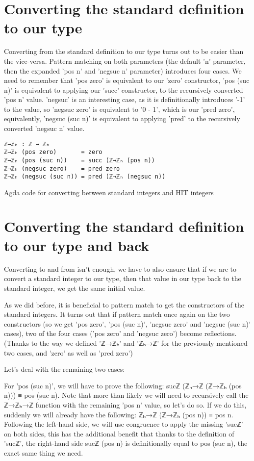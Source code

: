 \section{Converting the standard definition to our type}
Converting from the standard definition to our type turns out to be easier than the vice-versa. Pattern matching on both parameters (the default 'n' parameter, then the expanded 'pos n' and 'negsuc n' parameter) introduces four cases. We need to remember that 'pos zero' is equivalent to our 'zero' constructor, 'pos (suc n)' is equivalent to applying our 'succ' constructor, to the recursively converted 'pos n' value. 'negsuc' is an interesting case, as it is definitionally introduces '-1' to the value, so 'negsuc zero' is equivalent to '0 - 1', which is our 'pred zero', equivalently, 'negsuc (suc n)' is equivalent to applying 'pred' to the recursively converted 'negsuc n' value.
\begin{listing}[H]
\begin{verbatim}
ℤ→ℤₕ : ℤ → ℤₕ
ℤ→ℤₕ (pos zero)       = zero
ℤ→ℤₕ (pos (suc n))    = succ (ℤ→ℤₕ (pos n))
ℤ→ℤₕ (negsuc zero)    = pred zero
ℤ→ℤₕ (negsuc (suc n)) = pred (ℤ→ℤₕ (negsuc n))
\end{verbatim}
\caption{Agda code for converting between standard integers and HIT integers}
\end{listing}

\section{Converting the standard definition to our type and back}
Converting to and from isn't enough, we have to also ensure that if we are to convert a standard integer to our type, then that value in our type back to the standard integer, we get the same initial value.

As we did before, it is beneficial to pattern match to get the constructors of the standard integers. It turns out that if pattern match once again on the two constructors (so we get 'pos zero', 'pos (suc n)', 'negsuc zero' and 'negsuc (suc n)' cases), two of the four cases ('pos zero' and 'negsuc zero') become reflections. (Thanks to the way we defined 'ℤ→ℤₕ' and 'ℤₕ→ℤ' for the previously mentioned two cases, and 'zero' as well as 'pred zero')

Let's deal with the remaining two cases:

For 'pos (suc n)', we will have to prove the following: sucℤ (ℤₕ→ℤ (ℤ→ℤₕ (pos n))) ≡ pos (suc n). Note that more than likely we will need to recursively call the ℤ→ℤₕ→ℤ function with the remaining 'pos n' value, so let's do so. If we do this, suddenly we will already have the following: ℤₕ→ℤ (ℤ→ℤₕ (pos n)) ≡ pos n. Following the left-hand side, we will use congruence to apply the missing 'sucℤ' on both sides, this has the additional benefit that thanks to the definition of 'sucℤ', the right-hand side sucℤ (pos n) is definitionally equal to pos (suc n), the exact same thing we need.

